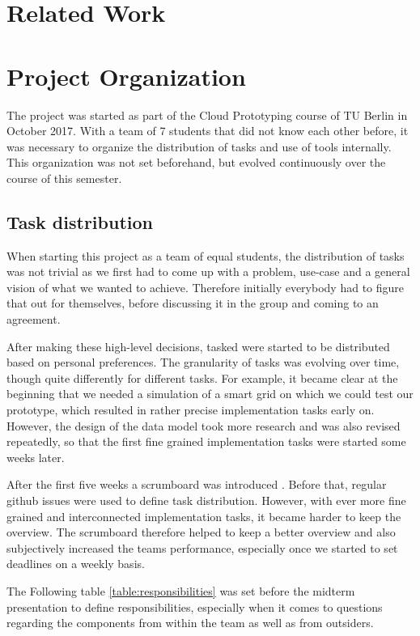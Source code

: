 \section{Related Work}




\section{Project Organization}

The project was started as part of the Cloud Prototyping course of TU Berlin in October 2017. 
With a team of 7 students that did not know each other before, it was necessary to organize the distribution of tasks and use of tools internally. 
This organization was not set beforehand, but evolved continuously over the course of this semester.

\subsection{Task distribution}

When starting this project as a team of equal students, the distribution of tasks was not trivial as we first had to come up with a problem, use-case and a general vision of what we wanted to achieve. 
Therefore initially everybody had to figure that out for themselves, before discussing it in the group and coming to an agreement.

After making these high-level decisions, tasked were started to be distributed based on personal preferences. 
The granularity of tasks was evolving over time, though quite differently for different tasks.
For example, it became clear at the beginning that we needed a simulation of a smart grid on which we could test our prototype, which resulted in rather precise implementation tasks early on. 
However, the design of the data model took more research and was also revised repeatedly, so that the first fine grained implementation tasks were started some weeks later.

After the first five weeks a scrumboard was introduced \cite{zenhub}. 
Before that, regular github issues were used to define task distribution. 
However, with ever more fine grained and interconnected implementation tasks, it became harder to keep the overview. 
The scrumboard therefore helped to keep a better overview and also subjectively increased the teams performance, especially once we started to set deadlines on a weekly basis.

The Following table \ref{table:responsibilities} was set before the midterm presentation to define responsibilities, especially when it comes to questions regarding the components from within the team as well as from outsiders.


